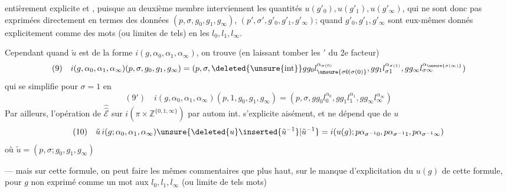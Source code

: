 entièrement explicite et , puisque au deuxième membre interviennent les quantités $u(g'_0),u(g'_1),u(g'_\infty)$, qui ne sont donc pas exprimées directement en termes des  données $(p,\sigma,g_0,g_1,g_\infty)$, $(p',\sigma',g'_0,g'_1,g'_\infty)$;  quand $g'_0,g'_1,g'_\infty$ sont eux-mêmes donnés explicitement comme des mots (ou limites de tels) en les $l_0,l_1,l_\infty$.

Cependant quand $\tilde u$ est de la forme $i(g,\alpha_0,\alpha_1,\alpha_\infty)$, on trouve (en laissant tomber les $'$ du 2e facteur)
\[
(9)\quad i(g,\alpha_0,\alpha_1,\alpha_\infty)(p,\sigma,g_0,g_1,g_\infty)=(p,\sigma,\deleted{\unsure{\operatorname{int}}}gg_0l_{\unsure{\sigma0|\sigma(0)}}^{\alpha_{\sigma(0)}},gg_1l_{\sigma1}^{\alpha_{\sigma(1)}},gg_\infty l_{\sigma\infty}^{\alpha_{\unsure{\sigma(\infty)}}})
\]
qui se simplifie pour $\sigma=1$ en
\[
(9')\quad i(g,\alpha_0,\alpha_1,\alpha_\infty)(p,1,g_0,g_1,g_\infty)=(p,\sigma,gg_0l_0^{\alpha_0},gg_1l_1^{\alpha_1},gg_\infty l_\infty^{\alpha_\infty})
\]
Par ailleurs, l'opération de $\widehat{\widehat{\mathcal E}}$ sur $i(\pi\times\mathbb Z^{\{0,1,\infty\}})$ par autom int. s'explicite aisément, et ne dépend que de $u$ 
\[
(10)\quad\tilde u\,i(g;\alpha_0,\alpha_1,\alpha_\infty)\unsure{\deleted{u}\inserted{\tilde u^{-1}}|\tilde u^{-1}}=i(u(g);p\alpha_{\sigma^{-1}0},p\alpha_{\sigma^{-1}1},p\alpha_{\sigma^{-1}\infty})
\]
où $\tilde u=(p,\sigma;g_0,g_1,g_\infty)$

--- mais sur cette formule, on peut faire les mêmes commentaires que plus haut, sur le manque d'explicitation du  $u(g)$ de cette formule, pour $g$ non exprimé comme un mot  aux $l_0,l_1,l_\infty$ (ou limite de tels mots)
